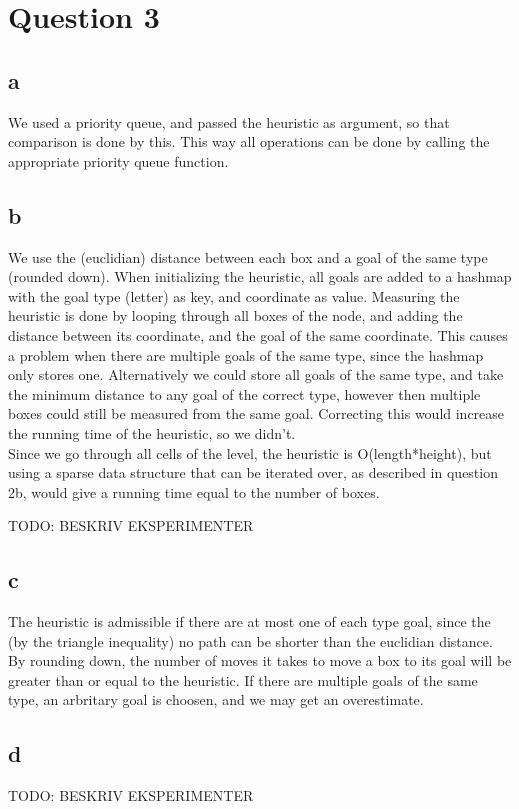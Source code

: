 \documentclass{article}
\begin{document}
\section{Question 3}
\subsection{a}
We used a priority queue, and passed the heuristic as argument, so that comparison is done by this. This way all operations can be done by calling the appropriate priority queue function.

\subsection{b}
We use the (euclidian) distance between each box and a goal of the same type (rounded down). When initializing the heuristic, all goals are added to a hashmap with the goal type (letter) as key, and coordinate as value. Measuring the heuristic is done by looping through all boxes of the node, and adding the distance between its
coordinate, and the goal of the same coordinate. This causes a problem when there are multiple goals of the same type, since the hashmap only stores one. Alternatively we could store all goals of the same type, and take the minimum distance to any goal of the correct type, however then multiple boxes could still be measured from the same goal. Correcting this would increase the running time of the heuristic, so we didn't.\\

Since we go through all cells of the level, the heuristic is O(length*height), but using a sparse data structure that can be iterated over, as described in question 2b, would give a running time equal to the number of boxes.

TODO: BESKRIV EKSPERIMENTER

\subsection{c}
The heuristic is admissible if there are at most one of each type goal, since the (by the triangle inequality) no path can be shorter than the euclidian distance. By rounding down, the number of moves it takes to move
a box to its goal will be greater than or equal to the heuristic. If there are multiple goals of the same type, an arbritary goal is choosen, and we may get an overestimate.

\subsection{d}
TODO: BESKRIV EKSPERIMENTER
\end{document}
